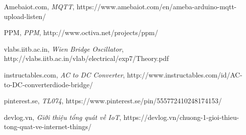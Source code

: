 \documentclass[a4paper,12pt,oneside]{article}
\begin{document}
\begin{thebibliography}{80}
 Amebaiot.com,
\textit{MQTT}, https://www.amebaiot.com/en/ameba-arduino-mqtt-upload-listen/
		
 PPM,
\textit{PPM}, http://www.octiva.net/projects/ppm/

 vlabs.iitb.ac.in,
\textit{Wien Bridge Oscillator}, http://vlabs.iitb.ac.in/vlab/electrical/exp7/Theory.pdf

 instructables.com,
\textit{AC to DC Converter}, http://www.instructables.com/id/AC-to-DC-converterdiode-bridge/

 pinterest.se,
\textit{TL074}, https://www.pinterest.se/pin/555772410248174153/

 devlog.vn,
\textit{Giới thiệu tổng quát về IoT}, https://devlog.vn/chuong-1-gioi-thieu-tong-quat-ve-internet-things/

\end{thebibliography}
\end{document}
